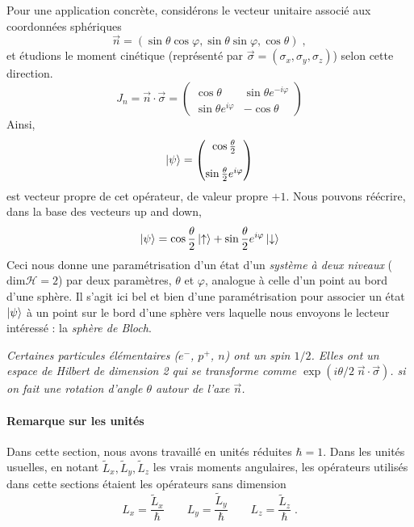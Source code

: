 \documentclass[../notesdecours.tex]{subfiles}
\begin{document}
Pour une application concrète, considérons le vecteur unitaire associé aux coordonnées sphériques  $$\vec{n} = \left(\sin\theta\cos\varphi,\sin\theta\sin\varphi,\cos\theta\right) \; ,$$ et étudions le moment cinétique (représenté par $\vec \sigma = (\sigma_x, \sigma_y, \sigma_z)$) selon cette direction. 
\begin{equation}
    J_n = \vec{n}\cdot\vec{\sigma} = \begin{pmatrix}
        \cos\theta & \sin\theta e^{-i\varphi}\\
        \sin\theta e^{i\varphi} & -\cos\theta
    \end{pmatrix}
\end{equation}
Ainsi,
$$\ket \psi = \begin{pmatrix}
    \cos\frac{\theta}{2}\\
    \strut \\
    \sin\frac{\theta}{2}e^{i\varphi}
\end{pmatrix}$$ est vecteur propre de cet opérateur, de valeur propre $+1$. Nous pouvons réécrire, dans la base des vecteurs up and down,
\begin{equation}
    \ket \psi = \cos\frac{\theta}{2}\ket{\uparrow}+\sin\frac{\theta}{2}e^{i\varphi}\ket{\downarrow}
\end{equation}
Ceci nous donne une paramétrisation d'un état d'un \textit{système à deux niveaux} ($\mathrm{dim}\mathcal{H}=2$) par deux paramètres, $\theta$ et $\varphi$, analogue à celle d'un point au bord d'une sphère. Il s'agit ici bel et bien d'une paramétrisation pour associer un état $\ket \psi$ à un point sur le bord d'une sphère vers laquelle nous envoyons le lecteur intéressé : la \textit{sphère de Bloch}.

\begin{leftbar}
    \textit{Certaines particules élémentaires ($e^-$, $p^+$, $n$) ont un spin $1/2$. Elles ont un espace de Hilbert de dimension 2 qui se transforme comme $\exp(i\theta/2 \; \vec n\cdot \vec \sigma)$. si on fait une rotation d'angle $\theta$ autour de l'axe $\vec n$.}
\end{leftbar}

\paragraph{Remarque sur les unités}
Dans cette section, nous avons travaillé en unités réduites $\hbar =  1$. Dans les unités usuelles, en notant $\tilde{L}_x, \tilde{L}_y, \tilde{L}_z$ les vrais moments angulaires, les opérateurs utilisés dans cette sections étaient les opérateurs sans dimension 
$$L_x = \dfrac{\tilde{L}_x}{\hbar} \qquad L_y = \dfrac{\tilde{L}_y}{\hbar} \qquad L_z = \dfrac{\tilde{L}_z}{\hbar}  \; .$$
\end{document}
